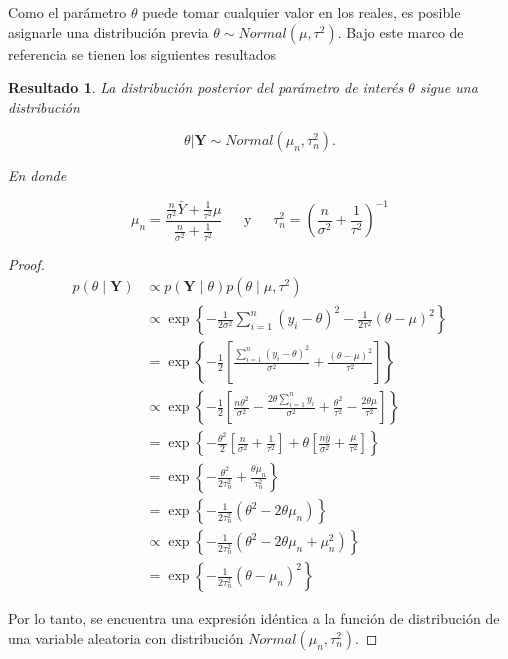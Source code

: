 \documentclass[
  10pt,
  spanish,
]{book}
\newtheorem{proposition}{Resultado}[chapter]
\theoremstyle{definition}
\theoremstyle{definition}
\theoremstyle{definition}
\theoremstyle{definition}
\theoremstyle{remark}
\begin{document}
Como el parámetro \(\theta\) puede tomar cualquier valor en los reales, es posible asignarle una distribución previa \(\theta \sim Normal(\mu,\tau^2)\). Bajo este marco de referencia se tienen los siguientes resultados

\begin{proposition}
\protect\hypertarget{prp:unnamed-chunk-67}{}{\label{prp:unnamed-chunk-67} }La distribución posterior del parámetro de interés \(\theta\) sigue una distribución

\begin{equation*}
\theta|\mathbf{Y} \sim Normal(\mu_n,\tau^2_n).
\end{equation*}

En donde

\begin{equation}
\label{eq:TauSigman}
\mu_n=\frac{\frac{n}{\sigma^2}\bar{Y}+\frac{1}{\tau^2}\mu}{\frac{n}{\sigma^2}+\frac{1}{\tau^2}}
\ \ \ \ \ \ \ \text{y} \ \ \ \ \ \ \
\tau_n^2=\left(\frac{n}{\sigma^2}+\frac{1}{\tau^2}\right)^{-1}
\end{equation}
\end{proposition}

\begin{proof}
{}\begin{align*}
p(\theta \mid \mathbf{Y})&\propto p(\mathbf{Y} \mid \theta)p(\theta \mid \mu,\tau^2)\\
&\propto \exp\left\{-\frac{1}{2\sigma^2}\sum_{i=1}^n(y_i-\theta)^2-\frac{1}{2\tau^2}(\theta-\mu)^2\right\}\\
&= \exp\left\{-\frac{1}{2}\left[\frac{\sum_{i=1}^n(y_i-\theta)^2}{\sigma^2}+\frac{(\theta-\mu)^2}{\tau^2}\right]\right\}\\
&\propto \exp\left\{-\frac{1}{2}\left[\frac{n\theta^2}{\sigma^2}-\frac{2\theta\sum_{i=1}^ny_i}{\sigma^2}+\frac{\theta^2}{\tau^2}-\frac{2\theta\mu}{\tau^2}\right]\right\}\\
&= \exp\left\{-\frac{\theta^2}{2}\left[\frac{n}{\sigma^2}+\frac{1}{\tau^2}\right]+
\theta\left[\frac{n\bar{y}}{\sigma^2}+\frac{\mu}{\tau^2}\right]\right\}\\
&= \exp\left\{-\frac{\theta^2}{2\tau^2_n}+\frac{\theta\mu_n}{\tau_n^2}\right\}\\
&= \exp\left\{-\frac{1}{2\tau^2_n}(\theta^2-2\theta\mu_n)\right\}\\
&\propto \exp\left\{-\frac{1}{2\tau^2_n}(\theta^2-2\theta\mu_n+\mu_n^2)\right\}\\
&= \exp\left\{-\frac{1}{2\tau^2_n}(\theta-\mu_n)^2\right\}
\end{align*}

Por lo tanto, se encuentra una expresión idéntica a la función de distribución de una variable aleatoria con distribución \(Normal(\mu_n,\tau_n^2)\).
\end{proof}
\end{document}
